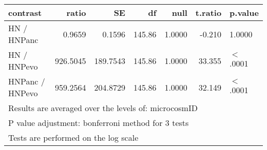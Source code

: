 \begin{table}[ht]
\centering
\begin{tabular}{lrrrrrl}
  \hline
contrast & ratio & SE & df & null & t.ratio & p.value \\ 
  \hline
HN / HNPanc & 0.9659 & 0.1596 & 145.86 & 1.0000 & -0.210 & 1.0000 \\ 
  HN / HNPevo & 926.5045 & 189.7543 & 145.86 & 1.0000 & 33.355 & $<$.0001 \\ 
  HNPanc / HNPevo & 959.2564 & 204.8729 & 145.86 & 1.0000 & 32.149 & $<$.0001 \\ 
   \hline
\multicolumn{7}{l}{{\footnotesize Results are averaged over the levels of: microcosmID}}\\

\multicolumn{7}{l}{{\footnotesize P value adjustment: bonferroni method for 3 tests}}\\

\multicolumn{7}{l}{{\footnotesize Tests are performed on the log scale}}\\
\end{tabular}
\end{table}

